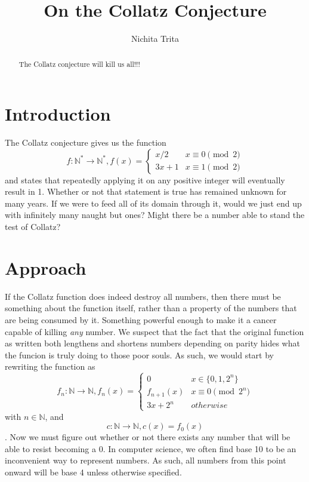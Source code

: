 \documentclass[10pt,a4paper,showpacs,nofootinbib,aps,superscriptaddress,eqsecnum,prd,showkeys,twocolumn,notitlepage]{article}
\author{Nichita Trita}
\title{On the Collatz Conjecture}
\begin{document}
\begin{abstract}
The Collatz conjecture will kill us all!!!
\end{abstract}

\maketitle

\section{Introduction}

The Collatz conjecture gives us the function 
\[f : \mathbb{N}^{*} \rightarrow \mathbb{N}^{*}, f(x) = 
\begin{cases}
	x / 2 & x\equiv 0 \pmod 2\\
	3x + 1 & x\equiv 1 \pmod 2
\end{cases}\] and states that repeatedly applying it on any positive integer will eventually result in 1. Whether or not that statement is true has remained unknown for many years. If we were to feed all of its domain through it, would we just end up with infinitely many naught but ones? Might there be a number able to stand the test of Collatz?

\section{Approach}

If the Collatz function does indeed destroy all numbers, then there must be something about the function itself, rather than a property of the numbers that are being consumed by it. Something powerful enough to make it a cancer capable of killing \textit{any} number.     
We suspect that the fact that the original function as written both lengthens and shortens numbers depending on parity hides what the funcion is truly doing to those poor souls. As such, we would start by rewriting the function as 
\[f_{n} : \mathbb{N} \rightarrow \mathbb{N}, 
f_{n}(x) = 
\begin{cases}
0 & x \in \{0, 1, 2^n\} \\
f_{n+1}(x) & x \equiv 0 \pmod {2^n} \\
3x + 2^n & otherwise
\end{cases}
\] with $n \in \mathbb{N}$, and 
\[ c : \mathbb{N} \rightarrow \mathbb{N}, c(x) = f_0(x)
\]. Now we must figure out whether or not there exists any number that will be able to resist becoming a $0$.
In computer science, we often find base 10 to be an inconvenient way to represent numbers. As such, all numbers from this point onward will be base 4 unless otherwise specified.
\end{document}
